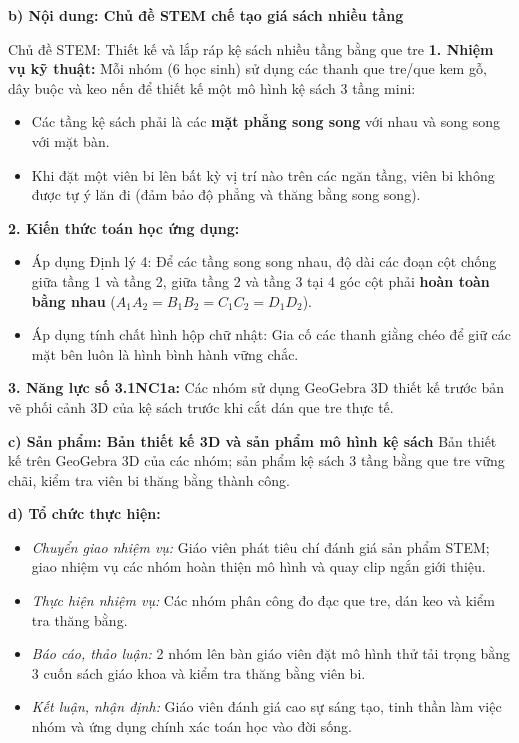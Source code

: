 \documentclass[12pt, a4paper]{article}
\begin{document}
\noindent \textbf{b) Nội dung: Chủ đề STEM chế tạo giá sách nhiều tầng}
\begin{stembox}{Chủ đề STEM: Thiết kế và lắp ráp kệ sách nhiều tầng bằng que tre}
\textbf{1. Nhiệm vụ kỹ thuật:}
Mỗi nhóm (6 học sinh) sử dụng các thanh que tre/que kem gỗ, dây buộc và keo nến để thiết kế một mô hình kệ sách 3 tầng mini:
\begin{itemize}[leftmargin=0.6cm]
    \item Các tầng kệ sách phải là các \textbf{mặt phẳng song song} với nhau và song song với mặt bàn.
    \item Khi đặt một viên bi lên bất kỳ vị trí nào trên các ngăn tầng, viên bi không được tự ý lăn đi (đảm bảo độ phẳng và thăng bằng song song).
\end{itemize}
\textbf{2. Kiến thức toán học ứng dụng:}
\begin{itemize}[leftmargin=0.6cm]
    \item Áp dụng Định lý 4: Để các tầng song song nhau, độ dài các đoạn cột chống giữa tầng 1 và tầng 2, giữa tầng 2 và tầng 3 tại 4 góc cột phải \textbf{hoàn toàn bằng nhau} ($A_1A_2 = B_1B_2 = C_1C_2 = D_1D_2$).
    \item Áp dụng tính chất hình hộp chữ nhật: Gia cố các thanh giằng chéo để giữ các mặt bên luôn là hình bình hành vững chắc.
\end{itemize}
\textbf{3. Năng lực số 3.1NC1a:} Các nhóm sử dụng GeoGebra 3D thiết kế trước bản vẽ phối cảnh 3D của kệ sách trước khi cắt dán que tre thực tế.
\end{stembox}

\noindent \textbf{c) Sản phẩm: Bản thiết kế 3D và sản phẩm mô hình kệ sách}
Bản thiết kế trên GeoGebra 3D của các nhóm; sản phẩm kệ sách 3 tầng bằng que tre vững chãi, kiểm tra viên bi thăng bằng thành công.

\noindent \textbf{d) Tổ chức thực hiện:}
\begin{itemize}[leftmargin=0.8cm]
    \item \textit{Chuyển giao nhiệm vụ:} Giáo viên phát tiêu chí đánh giá sản phẩm STEM; giao nhiệm vụ các nhóm hoàn thiện mô hình và quay clip ngắn giới thiệu.
    \item \textit{Thực hiện nhiệm vụ:} Các nhóm phân công đo đạc que tre, dán keo và kiểm tra thăng bằng.
    \item \textit{Báo cáo, thảo luận:} 2 nhóm lên bàn giáo viên đặt mô hình thử tải trọng bằng 3 cuốn sách giáo khoa và kiểm tra thăng bằng viên bi.
    \item \textit{Kết luận, nhận định:} Giáo viên đánh giá cao sự sáng tạo, tinh thần làm việc nhóm và ứng dụng chính xác toán học vào đời sống.
\end{itemize}
\end{document}
